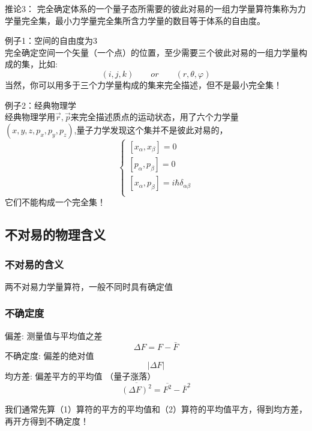 \begin{frame} [allowframebreaks=]
    \begin{tcolorbox1}{推论3：}
        完全确定体系的一个量子态所需要的彼此对易的一组力学量算符集称为力学量完全集，最小力学量完全集所含力学量的数目等于体系的自由度。
    \end{tcolorbox1}
    \alert{例子1：空间的自由度为3} \\
    完全确定空间一个矢量（一个点）的位置，至少需要三个彼此对易的一组力学量构成的集，比如: $$(i,j,k) \qquad or \qquad (r,\theta,\varphi) $$
    当然，你可以用多于三个力学量构成的集来完全描述，但不是最小完全集！\\
\end{frame} 

\begin{frame}
    \alert{例子2：经典物理学} \\
    经典物理学用$\vec{r}, \vec{p}$来完全描述质点的运动状态，用了六个力学量$(x,y,z, p_x, p_y, p_z)$,量子力学发现这个集并不是彼此对易的，
    $$\begin{cases}
        [x_\alpha,x_\beta]= 0  \\ 
        [p_\alpha,p_\beta]= 0  \\ 
        [x_\alpha,p_\beta]= i\hbar \delta_{\alpha\beta}  \\ 
    \end{cases}$$
    它们不能构成一个完全集！
\end{frame} 

\subsection{不对易的物理含义}

\begin{frame} 
    \frametitle{不对易的含义}
    \begin{tcolorbox4}[不确定性原理:]
        两不对易力学量算符，一般不同时具有确定值    
    \end{tcolorbox4}
\end{frame} 

\begin{frame} 
    \frametitle{不确定度}
    \begin{itemize}
        \Item 偏差: 测量值与平均值之差
        $$ \Delta F=F-\bar{F} $$
        \Item 不确定度: 偏差的绝对值
         $$ \left | \Delta F  \right | $$
        \Item 均方差: 偏差平方的平均值 （量子涨落）
        $$ \overline{(\Delta F)^2} = \overline{F^2} - \overline{F}^2$$
    \end{itemize}   
    我们通常先算（1）算符的平方的平均值和（2）算符的平均值平方，得到均方差，再开方得到不确定度！
\end{frame} 

